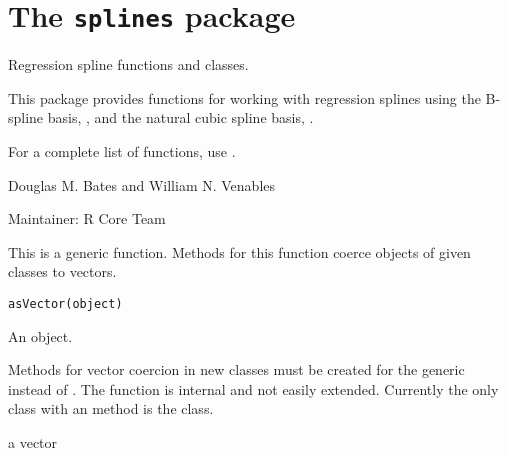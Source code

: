 
\chapter{The \texttt{splines} package}
%
\begin{Description}\relax
Regression spline functions and classes.
\end{Description}
%
\begin{Details}\relax
This package provides functions for working with regression
splines using the B-spline basis, , and the
natural cubic spline basis, .  

For a complete list of functions, use .

\end{Details}
%
\begin{Author}\relax
Douglas M. Bates  and William N. Venables

Maintainer: R Core Team 
\end{Author}
%
\begin{Description}\relax
This is a generic function.  Methods for this function coerce objects
of given classes to vectors.
\end{Description}
%
\begin{Usage}
\begin{verbatim}
asVector(object)
\end{verbatim}
\end{Usage}
%
\begin{Arguments}
\begin{ldescription}
\item[\code{object}] An object.
\end{ldescription}
\end{Arguments}
%
\begin{Details}\relax
Methods for vector coercion in new classes must be created for the
 generic instead of .  The
 function is internal and not easily extended.
Currently the only class with an  method is the
 class.
\end{Details}
%
\begin{Value}
a vector
\end{Value}
